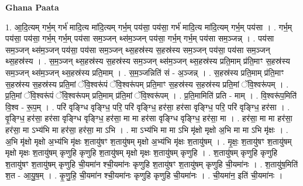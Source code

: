 \documentclass[17pt]{extarticle}
\begin{document}
\textbf{Ghana Paata } \newline

1. आ॒दि॒त्यम् गर्भ॒म् गर्भ॑ मादि॒त्य मा॑दि॒त्यम् गर्भ॒म् पय॑सा॒ पय॑सा॒ गर्भ॑ मादि॒त्य मा॑दि॒त्यम् गर्भ॒म् पय॑सा । . गर्भ॒म् पय॑सा॒ पय॑सा॒ गर्भ॒म् गर्भ॒म् पय॑सा सम॒ञ्जन् थ्स॑म॒ञ्जन् पय॑सा॒ गर्भ॒म् गर्भ॒म् पय॑सा सम॒ञ्जन्न् । . पय॑सा सम॒ञ्जन् थ्स॑म॒ञ्जन् पय॑सा॒ पय॑सा सम॒ञ्जन् थ्स॒हस्र॑स्य स॒हस्र॑स्य सम॒ञ्जन् पय॑सा॒ पय॑सा सम॒ञ्जन् थ्स॒हस्र॑स्य । . स॒म॒ञ्जन् थ्स॒हस्र॑स्य स॒हस्र॑स्य सम॒ञ्जन् थ्स॑म॒ञ्जन् थ्स॒हस्र॑स्य प्रति॒माम् प्र॑ति॒माꣳ स॒हस्र॑स्य सम॒ञ्जन् थ्स॑म॒ञ्जन् थ्स॒हस्र॑स्य प्रति॒माम् । . स॒म॒ञ्जन्निति॑ सं - अ॒ञ्जन्न् । . स॒हस्र॑स्य प्रति॒माम् प्र॑ति॒माꣳ स॒हस्र॑स्य स॒हस्र॑स्य प्रति॒मां ॅवि॒श्वरू॑पं ॅवि॒श्वरू॑पम् प्रति॒माꣳ स॒हस्र॑स्य स॒हस्र॑स्य प्रति॒मां ॅवि॒श्वरू॑पम् । . प्र॒ति॒मां ॅवि॒श्वरू॑पं ॅवि॒श्वरू॑पम् प्रति॒माम् प्र॑ति॒मां ॅवि॒श्वरू॑पम् । . प्र॒ति॒मामिति॑ प्रति - माम् । . वि॒श्वरू॑प॒मिति॑ वि॒श्व - रू॒प॒म् । . परि॑ वृङ्ग्धि वृङ्ग्धि॒ परि॒ परि॑ वृङ्ग्धि॒ हर॑सा॒ हर॑सा वृङ्ग्धि॒ परि॒ परि॑ वृङ्ग्धि॒ हर॑सा । . वृ॒ङ्ग्धि॒ हर॑सा॒ हर॑सा वृङ्ग्धि वृङ्ग्धि॒ हर॑सा॒ मा मा हर॑सा वृङ्ग्धि वृङ्ग्धि॒ हर॑सा॒ मा । . हर॑सा॒ मा मा हर॑सा॒ हर॑सा॒ मा ऽभ्य॑भि मा हर॑सा॒ हर॑सा॒ मा ऽभि । . मा ऽभ्य॑भि मा मा ऽभि मृ॑क्षो मृक्षो अ॒भि मा मा ऽभि मृ॑क्षः । . अ॒भि मृ॑क्षो मृक्षो अ॒भ्य॑भि मृ॑क्षः श॒तायु॑षꣳ श॒तायु॑षम् मृक्षो अ॒भ्य॑भि मृ॑क्षः श॒तायु॑षम् । . मृ॒क्षः॒ श॒तायु॑षꣳ श॒तायु॑षम् मृक्षो मृक्षः श॒तायु॑षम् कृणुहि कृणुहि श॒तायु॑षम् मृक्षो मृक्षः श॒तायु॑षम् कृणुहि । . श॒तायु॑षम् कृणुहि कृणुहि श॒तायु॑षꣳ श॒तायु॑षम् कृणुहि ची॒यमा॑न श्ची॒यमा॑नः कृणुहि श॒तायु॑षꣳ श॒तायु॑षम् कृणुहि ची॒यमा॑नः । . श॒तायु॑ष॒मिति॑ श॒त - आ॒यु॒ष॒म् । . कृ॒णु॒हि॒ ची॒यमा॑न श्ची॒यमा॑नः कृणुहि कृणुहि ची॒यमा॑नः । . ची॒यमा॑न॒ इति॑ ची॒यमा॑नः । \newline
\end{document}
